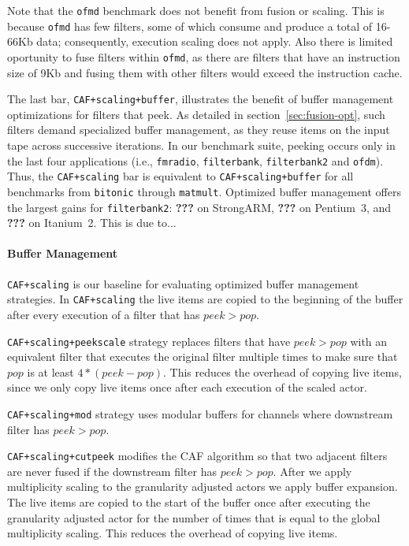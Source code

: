 Note that the \texttt{ofmd} benchmark does not benefit from fusion or
scaling. This is because \texttt{ofmd} has few filters, some of which
consume and produce a total of 16-66Kb data; consequently, execution
scaling does not apply.  Also there is limited oportunity to fuse
filters within \texttt{ofmd}, as there are filters that have an
instruction size of 9Kb and fusing them with other filters would
exceed the instruction cache.

The last bar, {\tt CAF+scaling+buffer}, illustrates the benefit of
buffer management optimizations for filters that peek.  As detailed in
section~\ref{sec:fusion-opt}, such filters demand specialized buffer
management, as they reuse items on the input tape across successive
iterations.  In our benchmark suite, peeking occurs only in the last
four applications (i.e., \texttt{fmradio}, \texttt{filterbank},
\texttt{filterbank2} and \texttt{ofdm}).  Thus, the {\tt CAF+scaling}
bar is equivalent to {\tt CAF+scaling+buffer} for all benchmarks from
{\tt bitonic} through {\tt matmult}.  Optimized buffer management
offers the largest gains for {\tt filterbank2}: {\bf ???} on
StrongARM, {\bf ???} on Pentium~3, and {\bf ???} on Itanium~2.  This
is due to...

\paragraph*{Buffer Management}


\texttt{CAF+scaling} is our baseline for evaluating optimized buffer 
management strategies. In \texttt{CAF+scaling} the live items are 
copied to the beginning of the buffer after every execution of a filter 
that has $peek>pop$.

\texttt{CAF+scaling+peekscale} strategy replaces filters that have
$peek>pop$ with an equivalent filter that executes the original filter 
multiple times to make sure that $pop$ is at least $4*(peek-pop)$.
This reduces the overhead of copying live items, since we only copy live 
items once after each execution of the scaled actor.

\texttt{CAF+scaling+mod} strategy uses modular buffers for channels where 
downstream filter has $peek>pop$.

\texttt{CAF+scaling+cutpeek} modifies the CAF algorithm so that two 
adjacent filters are never fused if the downstream filter has 
$peek>pop$. After we apply multiplicity scaling to the 
granularity adjusted actors we apply buffer expansion. The 
live items are copied to the start of the buffer once after executing 
the granularity adjusted actor for the number of times that is equal 
to the global multiplicity scaling. This reduces the overhead of 
copying live items.

